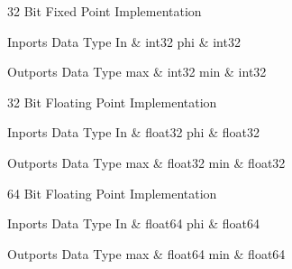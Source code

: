\ifdefined \AddTestReports
{}
\fi
{}
\nopagebreak[0]

32 Bit Fixed Point Implementation

\begin{XtoCtabular}{Inports Data Type}
In & int32\tabularnewline
\hline
phi & int32\tabularnewline
\hline
\end{XtoCtabular}

\begin{XtoCtabular}{Outports Data Type}
max & int32\tabularnewline
\hline
min & int32\tabularnewline
\hline
\end{XtoCtabular}

\ifdefined \AddTestReports
{}
\fi
{}
\nopagebreak[0]

32 Bit Floating Point Implementation

\begin{XtoCtabular}{Inports Data Type}
In & float32\tabularnewline
\hline
phi & float32\tabularnewline
\hline
\end{XtoCtabular}

\begin{XtoCtabular}{Outports Data Type}
max & float32\tabularnewline
\hline
min & float32\tabularnewline
\hline
\end{XtoCtabular}

\ifdefined \AddTestReports
{}
\fi
{}
\nopagebreak[0]

64 Bit Floating Point Implementation

\begin{XtoCtabular}{Inports Data Type}
In & float64\tabularnewline
\hline
phi & float64\tabularnewline
\hline
\end{XtoCtabular}

\begin{XtoCtabular}{Outports Data Type}
max & float64\tabularnewline
\hline
min & float64\tabularnewline
\hline
\end{XtoCtabular}

\ifdefined \AddTestReports
{}
\fi
